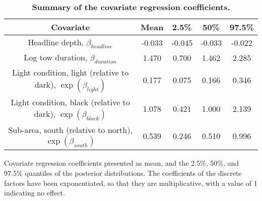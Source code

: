 \documentclass[10pt]{article}
\begin{document}
\begin{table}[!ht]
\caption{\bf{Summary of the covariate regression coefficients.}} 

\begin{tabular}{|c|c|c|c|c|}
\hline
Covariate & Mean & 2.5\% & 50\% & 97.5\% \\ \hline
  Headline depth, $\beta_{headline}$ & -0.033 & -0.045 & -0.033 & -0.022 \\
\hline
  Log tow duration, $\beta_{duration}$ & 1.470 & 0.700 & 1.462 & 2.285 \\
\hline
  Light condition, light (relative to dark), $\exp(\beta_{light})$ & 0.177 & 0.075 & 0.166 & 0.346 \\
\hline
  Light condition, black (relative to dark), $\exp(\beta_{black})$ & 1.078 & 0.421 & 1.000 & 2.139 \\
\hline
  Sub-area, south (relative to north), $\exp(\beta_{south})$ & 0.539 & 0.246 & 0.510 & 0.996 \\
\hline
 \end{tabular}

\begin{flushleft} Covariate regression coefficients presented as mean, 
and the 2.5\%, 50\%, and 97.5\% quantiles of the posterior distributions.  The
coefficients of the discrete factors have been exponentiated, so that they are multiplicative, with a value of 1 
indicating no effect.
\end{flushleft}
\label{tab:beta-contributions}
\end{table}


\end{document}
